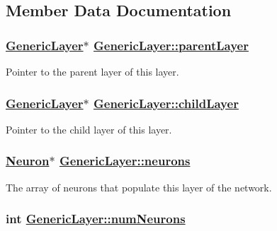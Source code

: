 \subsection{Member Data Documentation}
\hypertarget{classGenericLayer_f936bd9ef0690287bf7ce9fdddaec09d}{
\subsubsection[parentLayer]{\setlength{\rightskip}{0pt plus 5cm}\hyperlink{classGenericLayer}{Generic\-Layer}$\ast$ \hyperlink{classGenericLayer_f936bd9ef0690287bf7ce9fdddaec09d}{Generic\-Layer::parent\-Layer}}}
\label{classGenericLayer_f936bd9ef0690287bf7ce9fdddaec09d}


Pointer to the parent layer of this layer. \hypertarget{classGenericLayer_1eb75b8a4e3951ae983f801bb1d8c478}{
\subsubsection[childLayer]{\setlength{\rightskip}{0pt plus 5cm}\hyperlink{classGenericLayer}{Generic\-Layer}$\ast$ \hyperlink{classGenericLayer_1eb75b8a4e3951ae983f801bb1d8c478}{Generic\-Layer::child\-Layer}}}
\label{classGenericLayer_1eb75b8a4e3951ae983f801bb1d8c478}


Pointer to the child layer of this layer. \hypertarget{classGenericLayer_2464f709af50f9def120c1978ed68f24}{
\subsubsection[neurons]{\setlength{\rightskip}{0pt plus 5cm}\hyperlink{classNeuron}{Neuron}$\ast$ \hyperlink{classGenericLayer_2464f709af50f9def120c1978ed68f24}{Generic\-Layer::neurons}}}
\label{classGenericLayer_2464f709af50f9def120c1978ed68f24}


The array of neurons that populate this layer of the network. \hypertarget{classGenericLayer_7b45631903aa50e67fe5a1947fc292bd}{
\subsubsection[numNeurons]{\setlength{\rightskip}{0pt plus 5cm}int \hyperlink{classGenericLayer_7b45631903aa50e67fe5a1947fc292bd}{Generic\-Layer::num\-Neurons}}}
\label{classGenericLayer_7b45631903aa50e67fe5a1947fc292bd}



